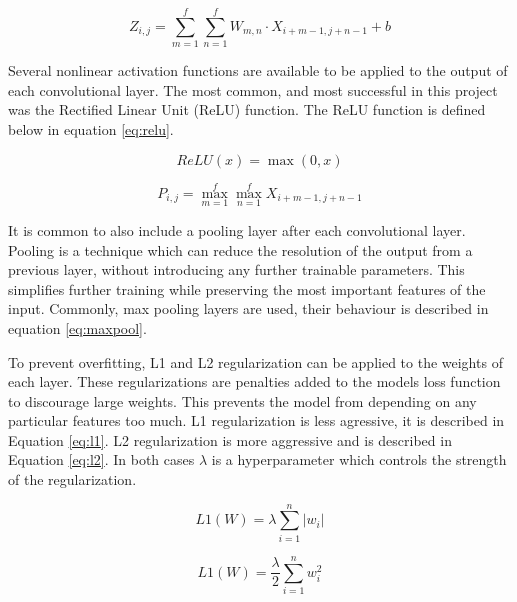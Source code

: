 \documentclass[10pt]{article}
\begin{document}
\begin{equation}\label{eq:conv}
  Z_{i,j} = \sum_{m=1}^{f}\sum_{n=1}^{f} W_{m,n} \cdot X_{i+m-1,j+n-1} + b
\end{equation}

Several nonlinear activation functions are available to be applied to the output
of each convolutional layer. The most common, and most successful in this project
was the Rectified Linear Unit (ReLU) function. The ReLU function is defined below in
equation \ref{eq:relu}.

\begin{minipage}{0.45\linewidth}
  \begin{equation}\label{eq:relu}
    ReLU(x) = \max(0, x)
  \end{equation}
\end{minipage}
\hfill
\begin{minipage}{0.45\linewidth}
  \begin{equation}\label{eq:maxpool}
    P_{i,j} = \max_{m=1}^{f}\max_{n=1}^{f} X_{i+m-1,j+n-1}
  \end{equation}
\end{minipage}

It is common to also include a pooling layer after each convolutional layer. Pooling
is a technique which can reduce the resolution of the output from a previous layer,
without introducing any further trainable parameters. This simplifies further training
while preserving the most important features of the input. Commonly, max pooling layers
are used, their behaviour is described in equation \ref{eq:maxpool}.

To prevent overfitting, L1 and L2 regularization can be applied to the weights of
each layer. These regularizations are penalties added to the models loss function
to discourage large weights. This prevents the model from depending on any particular
features too much. L1 regularization is less agressive, it is described in Equation
\ref{eq:l1}. L2 regularization is more aggressive and is described in Equation \ref{eq:l2}.
In both cases $\lambda$ is a hyperparameter which controls the strength of the regularization.

\begin{minipage}{0.45\linewidth}
  \begin{equation}\label{eq:l1}
    L1(W) = \lambda\sum_{i=1}^n |w_i|
  \end{equation}
\end{minipage}
\hfill
\begin{minipage}{0.45\linewidth}
  \begin{equation}\label{eq:l2}
    L1(W) = \frac{\lambda}{2}\sum_{i=1}^n w_i^2
  \end{equation}
\end{minipage}
\end{document}
